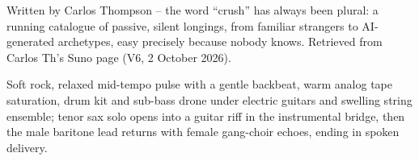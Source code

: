
\begin{notes}
Written by Carlos Thompson -- the word ``crush'' has always been plural: a running catalogue of passive, silent longings, from familiar strangers to AI-generated archetypes, easy precisely because nobody knows. Retrieved from Carlos Th's Suno page (V6, 2 October 2026).
\end{notes}
\begin{style}
Soft rock, relaxed mid-tempo pulse with a gentle backbeat, warm analog tape saturation, drum kit and sub-bass drone under electric guitars and swelling string ensemble; tenor sax solo opens into a guitar riff in the instrumental bridge, then the male baritone lead returns with female gang-choir echoes, ending in spoken delivery.
\end{style}
